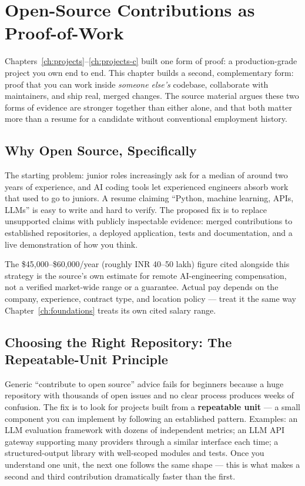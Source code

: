 \chapter{Open-Source Contributions as Proof-of-Work}
\label{ch:open-source}

Chapters~\ref{ch:projects}--\ref{ch:projects-c} built one form of proof: a production-grade project you own
end to end. This chapter builds a second, complementary form: proof that you can work inside \emph{someone
else's} codebase, collaborate with maintainers, and ship real, merged changes. The source material argues these
two forms of evidence are stronger together than either alone, and that both matter more than a resume for a
candidate without conventional employment history.

\section{Why Open Source, Specifically}

The starting problem: junior roles increasingly ask for a median of around two years of experience, and AI
coding tools let experienced engineers absorb work that used to go to juniors. A resume claiming ``Python,
machine learning, APIs, LLMs'' is easy to write and hard to verify. The proposed fix is to replace unsupported
claims with publicly inspectable evidence: merged contributions to established repositories, a deployed
application, tests and documentation, and a live demonstration of how you think.

\begin{caution}
The \$45,000--\$60,000/year (roughly INR 40--50 lakh) figure cited alongside this strategy is the
source's own estimate for remote AI-engineering compensation, not a verified market-wide range or a guarantee.
Actual pay depends on the company, experience, contract type, and location policy --- treat it the same way
Chapter~\ref{ch:foundations} treats its own cited salary range.
\end{caution}

\section{Choosing the Right Repository: The Repeatable-Unit Principle}

Generic ``contribute to open source'' advice fails for beginners because a huge repository with thousands of
open issues and no clear process produces weeks of confusion. The fix is to look for projects built from a
\textbf{repeatable unit} --- a small component you can implement by following an established pattern. Examples:
an LLM evaluation framework with dozens of independent metrics; an LLM API gateway supporting many providers
through a similar interface each time; a structured-output library with well-scoped modules and tests. Once you
understand one unit, the next one follows the same shape --- this is what makes a second and third contribution
dramatically faster than the first.

